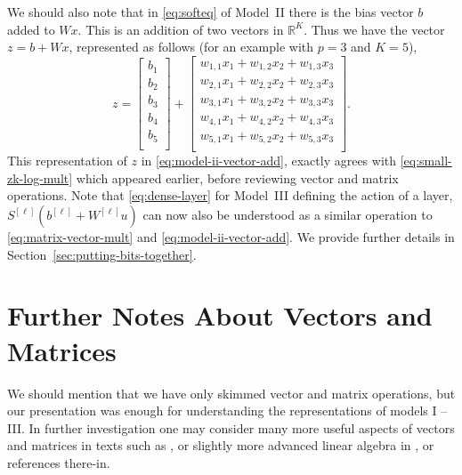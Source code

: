 \documentclass[12pt]{article}
\begin{document}
We should also note that in \eqref{eq:softeq} of Model~II there is the bias vector $b$ added to $Wx$. This is an addition of two vectors in ${\mathbb R}^K$. Thus we have the vector $z = b + Wx$, represented as follows (for an example with $p=3$ and $K=5$),
%
\begin{equation}
\label{eq:model-ii-vector-add} 
z = 
\begin{bmatrix}
b_1 \\
b_2 \\
b_3 \\
b_4 \\
b_5 \\
\end{bmatrix}
+
\begin{bmatrix}
w_{1,1}x_1 + w_{1,2} x_2 + w_{1,3} x_3 \\
w_{2,1}x_1 + w_{2,2} x_2 + w_{2,3} x_3\\
w_{3,1}x_1 + w_{3,2} x_2 + w_{3,3} x_3\\
w_{4,1}x_1 + w_{4,2} x_2 + w_{4,3} x_3\\
w_{5,1}x_1 + w_{5,2} x_2 + w_{5,3} x_3\\
\end{bmatrix}.
\end{equation}
%
This representation of $z$ in \eqref{eq:model-ii-vector-add}, exactly agrees with \eqref{eq:small-zk-log-mult} which appeared earlier, before reviewing vector and matrix operations. Note that \eqref{eq:dense-layer} for Model~III defining the action of a layer, $S^{[\ell]}(b^{[\ell]} + W^{[\ell]} u)$ can now also be understood as a similar operation to \eqref{eq:matrix-vector-mult} and \eqref{eq:model-ii-vector-add}. We provide further details in Section~\ref{sec:putting-bits-together}.

\section{Further Notes About Vectors and Matrices}
\label{sec:further-notes}

We should mention that we have only skimmed vector and matrix operations, but our presentation was enough for understanding the representations of models I -- III. In further investigation one may consider many more useful aspects of vectors and matrices in texts such as \cite{boyd2018introduction}, or slightly more advanced linear algebra in \cite{strang2019linear}, or references there-in. 
\end{document}
